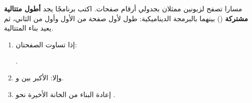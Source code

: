 \begin{statement}
مسارا تصفح لزبونين ممثلان بجدولي أرقام صفحات. اكتب برنامجًا يجد \textbf{أطول متتالية مشتركة} () بينهما بالبرمجة الديناميكية:  طول  لأول  صفحة من الأول وأول  من الثاني، ثم يعيد بناء المتتالية.
\end{statement}
\begin{stepsbox}\begin{enumerate}
\item إذا تساوت الصفحتان: \par{\centering\small{}\par}.
\item وإلا: الأكبر بين  و.
\item إعادة البناء من الخانة الأخيرة نحو \code{[0][0]}.
\end{enumerate}\end{stepsbox}
